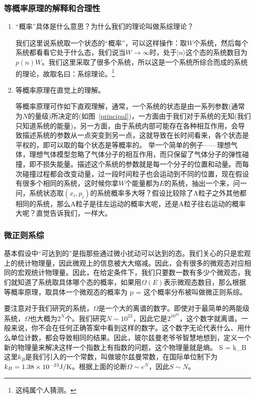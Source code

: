 \documentclass[11pt]{ctexart}
\begin{document}
\subsubsection{等概率原理的解释和合理性}
\begin{enumerate}
	\item “概率”具体是什么意思？为什么我们的理论叫做系综理论？

	我们这里说系统取一个状态的“概率”，可以这样操作：取$W$个系统，然后每个系统都看看它处于什么态，我们说当$W\rightarrow \infty$时，处于$|n\rangle$这个态的系统数目为$p(n)W$。我们这里采取了很多个系统，所以这是一个系统所综合而成的系统的理论，故取名曰：系综理论。\footnote{这纯属个人猜测。}
	\item 等概率原理在直觉上的理解。

等概率原理可作如下直观理解，通常，一个系统的状态是由一系列参数(通常为$N$的量级)所决定的(如图~\ref{principal})，一方面由于我们对于系统的无知(我们只知道系统的能量)，另一方面，由于系统内部可能存在各种相互作用，会导致描述系统的参数从一点突变到另一点，这就导致在长时间看来，各个状态是平权的，即可以取的每个状态是等概率的。
举一个简单的例子——理想气体，理想气体模型忽略了气体分子的相互作用，而只保留了气体分子的弹性碰撞，即不损失能量。描述这个系统的参数就是每一个分子的位置和动量。而每次碰撞过程都会改变动量，过一段时间粒子也会运动到不同的位置，现在假设有很多个相同的系统，这时候你拿$W$个能量都为$E$的系统，抽出一个来，问一问，系统状态取$(x_i,p_i)$的系统概率多大呀？假设比较除了A粒子之外其他都相同的系统，那么A粒子是往左运动的概率大呢，还是A粒子往右运动的概率大呢？直觉告诉我们，一样大。
\end{enumerate}
\subsubsection{微正则系综}

基本假设中“可达到的”是指那些通过微小扰动可以达到的态。我们关心的只是宏观上的统计物理量，因此微观上的信息被大大缩减。因此，会有很多的微观态对应相同的宏观统计物理量。因此，在给定条件下，我们只要数一数有多少个微观态，我们就知道了系统取具体哪个态的概率，如果用$\Omega (E)$表示微观态数目，那么根据等概率原理，取具体一个微观态的概率为
\beq
p = 
\eeq
这个概率分布被叫做微正则系综。

要注意对于我们研究的系统，$\Omega$是一个大的离谱的数字。即使对于最简单的两能级系统，$\Omega$也大概为$2^N$个。我们研究$N\sim 10^{23}$，因此它是$2^{10^{23}}$，这个数字就离谱。一般来说，你不会在任何正确答案中看到这样的数字。这个数字无论代表什么、用什么单位计数，都会导致相同的结果。因此，玻尔兹曼老爷爷智慧地想到，定义一个新的物理量来解决这样一个指数上有指数的问题，这个物理量就是熵。
\beq
S = k_B \log \Omega
\eeq
这里$k_B$是我们引入的一个常数，叫做玻尔兹曼常数，在国际单位制下为$k_B = 1.38\times 10^{-23} {\rm J/K}$。根据上面的论断$\Omega\sim e^N$，因此$S\sim N$。
\end{document}
